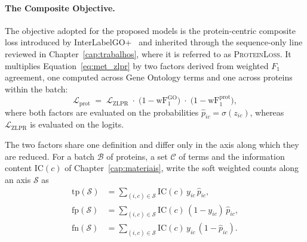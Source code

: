 \documentclass[Ingles]{ic-tese-v3}
\begin{document}
\paragraph{The Composite Objective.} The objective adopted for the proposed models is the
protein-centric composite loss introduced by InterLabelGO+~\cite{liu2024interlabelgo} and inherited
through the sequence-only line reviewed in Chapter~\ref{cap:trabalhos}, where it is referred to as \textsc{ProteinLoss}. It multiplies Equation~\eqref{eq:met_zlpr} by two factors derived from weighted
$F_1$ agreement, one computed across Gene Ontology terms and one across proteins within the batch:
\begin{equation}
  \mathcal{L}_{\text{prot}} \;=\; \mathcal{L}_{\text{ZLPR}} \;\cdot\;
  \bigl(1 - \mathrm{wF}_1^{\text{GO}}\bigr) \;\cdot\;
  \bigl(1 - \mathrm{wF}_1^{\text{prot}}\bigr),
  \label{eq:met_proteinloss}
\end{equation}
\noindent where both factors are evaluated on the probabilities $\hat{p}_{ic} = \sigma(z_{ic})$, whereas
$\mathcal{L}_{\text{ZLPR}}$ is evaluated on the logits.

The two factors share one definition and differ only in the axis along which they are reduced. For a
batch $\mathcal{B}$ of proteins, a set $\mathcal{C}$ of terms and the information content
$\mathrm{IC}(c)$ of Chapter~\ref{cap:materiais}, write the soft weighted counts along an axis
$\mathcal{S}$ as
\begin{equation}
  \begin{aligned}
    \mathrm{tp}(\mathcal{S}) &= \sum_{(i,c) \in \mathcal{S}} \mathrm{IC}(c)\, y_{ic}\, \hat{p}_{ic}, \\
    \mathrm{fp}(\mathcal{S}) &= \sum_{(i,c) \in \mathcal{S}} \mathrm{IC}(c)\, (1 - y_{ic})\, \hat{p}_{ic}, \\
    \mathrm{fn}(\mathcal{S}) &= \sum_{(i,c) \in \mathcal{S}} \mathrm{IC}(c)\, y_{ic}\, (1 - \hat{p}_{ic}).
  \end{aligned}
  \label{eq:met_softcounts}
\end{equation}
\end{document}
